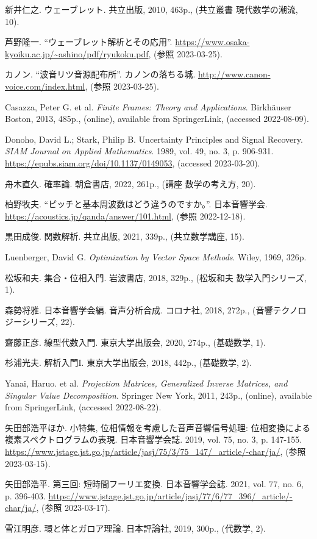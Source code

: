 \documentclass[../../main]{subfiles}
\begin{document}
{}
\begin{thebibliography}{99}
    新井仁之. ウェーブレット. 共立出版, 2010, 463p., (共立叢書 現代数学の潮流, 10).

    芦野隆一. “ウェーブレット解析とその応用”. \url{https://www.osaka-kyoiku.ac.jp/~ashino/pdf/ryukoku.pdf}, (参照 2023-03-25).

    カノン. “波音リツ音源配布所”. カノンの落ちる城. \url{http://www.canon-voice.com/index.html}, (参照 2023-03-25).

    Casazza, Peter G. et al. \textit{Finite Frames: Theory and Applications}. Birkhäuser Boston, 2013, 485p., (online), available from SpringerLink, (accessed 2022-08-09).

    Donoho, David L.; Stark, Philip B. Uncertainty Principles and Signal Recovery. \textit{SIAM Journal on Applied Mathematics}. 1989, vol. 49, no. 3, p. 906-931. \url{https://epubs.siam.org/doi/10.1137/0149053}, (accessed 2023-03-20).

    舟木直久. 確率論. 朝倉書店, 2022, 261p., (講座 数学の考え方, 20).

    柏野牧夫. “ピッチと基本周波数はどう違うのですか。”. 日本音響学会. \url{https://acoustics.jp/qanda/answer/101.html}, (参照 2022-12-18).

    黒田成俊. 関数解析. 共立出版, 2021, 339p., (共立数学講座, 15).

    Luenberger, David G. \textit{Optimization by Vector Space Methods}. Wiley, 1969, 326p.

    松坂和夫. 集合・位相入門. 岩波書店, 2018, 329p., (松坂和夫 数学入門シリーズ, 1).

    森勢将雅. 日本音響学会編. 音声分析合成. コロナ社, 2018, 272p., (音響テクノロジーシリーズ, 22).

    齋藤正彦. 線型代数入門. 東京大学出版会, 2020, 274p., (基礎数学, 1).

    杉浦光夫. 解析入門I. 東京大学出版会, 2018, 442p., (基礎数学, 2).

    Yanai, Haruo. et al. \textit{Projection Matrices, Generalized Inverse Matrices, and Singular Value Decomposition}. Springer New York, 2011, 243p., (online), available from SpringerLink, (accessed 2022-08-22).

    矢田部浩平ほか. 小特集, 位相情報を考慮した音声音響信号処理: 位相変換による複素スペクトログラムの表現. 日本音響学会誌. 2019, vol. 75, no. 3, p. 147-155. \url{https://www.jstage.jst.go.jp/article/jasj/75/3/75_147/_article/-char/ja/}, (参照 2023-03-15).

    矢田部浩平. 第三回: 短時間フーリエ変換. 日本音響学会誌. 2021, vol. 77, no. 6, p. 396-403. \url{https://www.jstage.jst.go.jp/article/jasj/77/6/77_396/_article/-char/ja/}, (参照 2023-03-17).

    雪江明彦. 環と体とガロア理論. 日本評論社, 2019, 300p., (代数学, 2).
\end{thebibliography}
\end{document}
